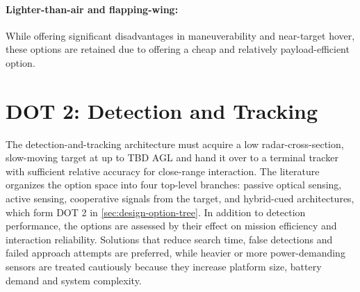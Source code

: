 \paragraph{Lighter-than-air and flapping-wing:} While offering significant disadvantages in maneuverability and near-target hover, these options are retained due to offering a cheap and relatively payload-efficient option.
\vspace{-10pt}


\section{DOT 2: Detection and Tracking}
\label{sec:dot_sensing}



The detection-and-tracking architecture must acquire a low radar-cross-section, slow-moving target at up to TBD AGL and hand it over to a terminal tracker with sufficient relative accuracy for close-range interaction. The literature organizes the option space into four top-level branches: passive optical sensing, active sensing, cooperative signals from the target, and hybrid-cued architectures, which form DOT 2 in \autoref{sec:design-option-tree}. In addition to detection performance, the options are assessed by their effect on mission efficiency and interaction reliability. Solutions that reduce search time, false detections and failed approach attempts are preferred, while heavier or more power-demanding sensors are treated cautiously because they increase platform size, battery demand and system complexity.

\vspace{-10pt}
